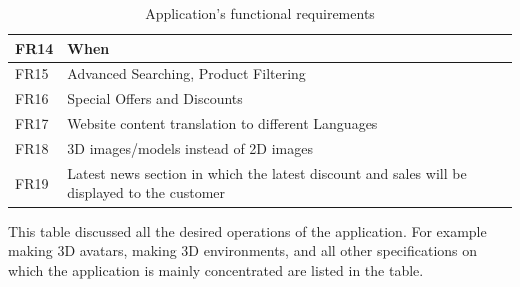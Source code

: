 \begin{table}[H]
\begin{tabular}{ | m{8em} | m{10cm} | }
          \\  \hline FR14 & When
          \\  \hline FR15 & Advanced Searching, Product Filtering
          \\  \hline FR16 & Special Offers and Discounts
          \\  \hline FR17 & Website content translation to different Languages
         \\  \hline FR18 & 3D images/models instead of 2D images
          \\  \hline FR19 & Latest news section in which the latest discount and sales will be displayed to the customer
         
     \\  \hline
     \end{tabular}
     
          \caption{Application’s functional requirements}
          \label{Application’s functional requirements}
          
      \end{table}
      
    This table discussed all the desired operations of the application. For example making 3D avatars, making 3D environments, and all other specifications on which the application is mainly concentrated are listed in the table.
